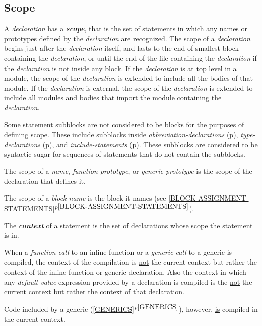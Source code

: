 \documentclass[12pt]{article}
\newcommand{\key}[1]{{\bf \em #1}\index{#1}}
\newcommand{\itemref}[1]{\ref{#1}$^{p\pageref{#1}}$}
\newcommand{\pagref}[1]{p\pageref{#1}}
\begin{document}
\subsection{Scope}
\label{SCOPE}

A {\em declaration} has a \key{scope},
that is the set of statements in which any
names or prototypes defined by the {\em declaration}
are recognized.  The scope of a {\em declaration}
begins just after the {\em declaration}
itself, and
lasts to the end of smallest block containing the {\em declaration},
or until the end of the file containing the {\em declaration} if
the {\em declaration} is not inside any block.
If the {\em declaration} is at top level in a module, the scope of the
{\em declaration} is extended to include all the bodies of that
module.
If the {\em declaration} is external, the scope of the
{\em declaration} is extended to include all modules and
bodies that import the module containing the {\em declaration}.

Some statement subblocks are not considered to be blocks for
the purposes of defining scope.  These include subblocks inside
{\em abbreviation-declarations} (\pagref{ABBREVIATION-DECLARATION}),
{\em type-declarations} (\pagref{TYPE-DECLARATION}),
and {\em in\-clude-statements} (\pagref{INCLUDE-STATEMENT}).
These subblocks are considered to be syntactic sugar for
sequences of statements that do not contain the subblocks.

The scope of a {\em name}, {\em function-prototype}, or
{\em generic-prototype}
is the scope of the declaration that defines it.

The scope of a {\em block-name} is the block it names
(see \itemref{BLOCK-ASSIGNMENT-STATEMENTS}).

The \key{context}\label{CONTEXT} of a statement is the set of declarations
whose scope the statement is in.

When a {\em function-call} to an inline function
or a {\em generic-call} to a generic is compiled,
the context of the compilation is \underline{not} the current context but
rather the context of the inline function or generic
declaration.
Also the context in which any {\em default-value} expression
provided by a declaration
is compiled is the \underline{not} the current context but
rather the context of that declaration.

Code included by a generic
(\itemref{GENERICS}), however, \underline{is} compiled in the current context.
\end{document}

